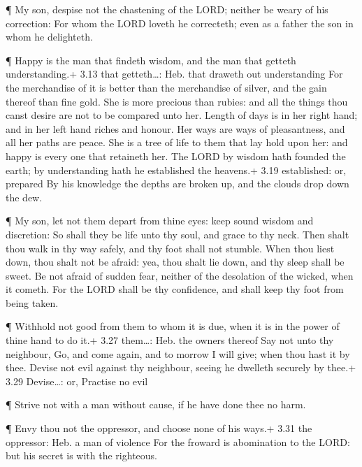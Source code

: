  ¶ My son, despise not the chastening of the LORD; neither
be weary of his correction:  For whom the LORD loveth he
correcteth; even as a father the son in whom he delighteth.

 ¶ Happy is the man that findeth wisdom, and the man that
getteth understanding.+ 3.13 that getteth\ldots: Heb. that draweth out
understanding  For the merchandise of it is better than the
merchandise of silver, and the gain thereof than fine gold.
 She is more precious than rubies: and all the things thou
canst desire are not to be compared unto her.  Length of
days is in her right hand; and in her left hand riches and honour.
 Her ways are ways of pleasantness, and all her paths are
peace.  She is a tree of life to them that lay hold upon
her: and happy is every one that retaineth her.  The LORD
by wisdom hath founded the earth; by understanding hath he established
the heavens.+ 3.19 established: or, prepared  By his
knowledge the depths are broken up, and the clouds drop down the dew.

 ¶ My son, let not them depart from thine eyes: keep sound
wisdom and discretion:  So shall they be life unto thy
soul, and grace to thy neck.  Then shalt thou walk in thy
way safely, and thy foot shall not stumble.  When thou
liest down, thou shalt not be afraid: yea, thou shalt lie down, and thy
sleep shall be sweet.  Be not afraid of sudden fear,
neither of the desolation of the wicked, when it cometh. 
For the LORD shall be thy confidence, and shall keep thy foot from being
taken.

 ¶ Withhold not good from them to whom it is due, when it
is in the power of thine hand to do it.+ 3.27 them\ldots: Heb. the
owners thereof  Say not unto thy neighbour, Go, and come
again, and to morrow I will give; when thou hast it by thee.
 Devise not evil against thy neighbour, seeing he dwelleth
securely by thee.+ 3.29 Devise\ldots: or, Practise no evil

 ¶ Strive not with a man without cause, if he have done
thee no harm.

 ¶ Envy thou not the oppressor, and choose none of his
ways.+ 3.31 the oppressor: Heb. a man of violence  For the
froward is abomination to the LORD: but his secret is with the
righteous.

